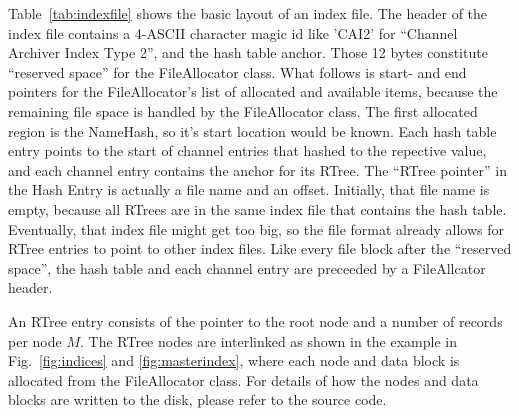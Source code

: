 \noindent Table~\ref{tab:indexfile} shows the basic layout of an index
file.  The header of the index file contains a 4-ASCII character magic
id like 'CAI2' for ``Channel Archiver Index Type 2'', and the hash
table anchor.  Those 12 bytes constitute ``reserved space'' for the
FileAllocator class. What follows is start- and end pointers for the
FileAllocator's list of allocated and available items, because the
remaining file space is handled by the FileAllocator class.  The first
allocated region is the NameHash, so it's start location would be
known. Each hash table entry points to the start of channel entries
that hashed to the repective value, and each channel entry contains
the anchor for its RTree.  The ``RTree pointer'' in the Hash Entry is
actually a file name and an offset. Initially, that file name is
empty, because all RTrees are in the same index file that contains the
hash table. Eventually, that index file might get too big, so the file
format already allows for RTree entries to point to other index files.
Like every file block after the ``reserved space'', the hash table and
each channel entry are preceeded by a FileAllcator header.

An RTree entry consists of the pointer to the root node and a number
of records per node $M$. The RTree nodes are interlinked as shown in
the example in Fig.~\ref{fig:indices} and \ref{fig:masterindex}, where
each node and data block is allocated from the FileAllocator class.
For details of how the nodes and data blocks are written to the disk,
please refer to the source code.
